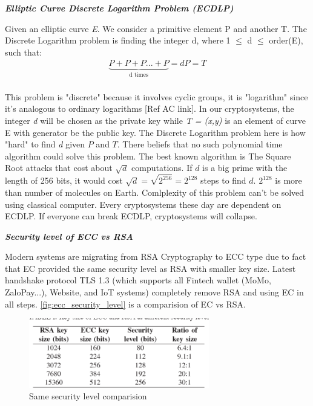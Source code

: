 \bigskip
{\textit {\textbf{Elliptic Curve Discrete Logarithm Problem (ECDLP)}}}
\begin{definition}
	Given an elliptic curve \emph{E}. We consider a primitive element P and another T. The Discrete Logarithm problem is finding the integer d, where 1 $\leq$ d $\leq$ order(E), such that: \medskip
	\begin{align*}
		\underbrace{P + P + P ... + P}_\text{d times} = dP = T\\
	\end{align*}
\end{definition}

This problem is "discrete" because it involves cyclic groups, it is "logarithm" since it's analogous to ordinary logarithms [Ref AC link].
In our cryptosystems, the integer \emph{d} will be chosen as the private key while \emph{T = (x,y)} is an element of curve E with generator be the public key. 
The Discrete Logarithm problem here is how "hard" to find \emph{d} given $P$ and $T$. 
There beliefs that no such polynomial time algorithm could solve this problem.
The best known algorithm is The Square Root attacks that cost about $\sqrt{d}$ computations.
If $d$ is a big prime with the length of 256 bits, it would cost $\sqrt{d} = \sqrt{2^{256}} = 2^{128}$ steps to find $d$. 
$2^{128}$ is more than number of molecules on Earth.
Comlplexity of this problem can't be solved using classical computer. 
Every cryptosystems these day are dependent on ECDLP. 
If everyone can break ECDLP, cryptosystems will collapse.  

\bigskip
{\textit {\textbf{Security level of ECC vs RSA}}}

Modern systems are migrating from RSA Cryptography to ECC type due to fact that EC provided the same security level as RSA with smaller key size.
Latest handshake protocol TLS 1.3 (which supports all Fintech wallet (MoMo, ZaloPay...), Website, and IoT systems) completely remove RSA and using EC in all steps.
\autoref{fig:ecc_security_level} is a comparision of EC vs RSA.

\begin{figure}[h!]
	\centering
	\includegraphics[width=0.7\textwidth]{images/ecc_security_level.png}
	\caption[EC vs RSA]{Same security level comparision}
	\label{fig:ecc_security_level}
\end{figure}

